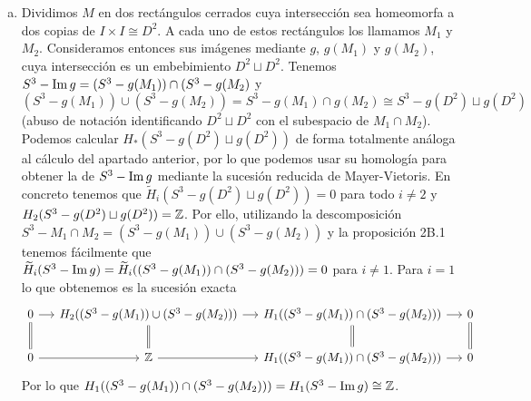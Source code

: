 \documentclass[twoside]{article}
\begin{document}
\begin{solucion}
\begin{enumerate}[(a)]
%



\item Dividimos $M$ en dos rectángulos cerrados cuya intersección sea homeomorfa a dos copias de $I\times I\cong D^2$. A cada uno de estos rectángulos los llamamos $M_1$ y $M_2$. Consideramos entonces sus imágenes mediante $g$, $g(M_1)$ y $g(M_2)$, cuya intersección es un embebimiento $D^2\sqcup D^2$. Tenemos $S^3-\operatorname{Im} g =(S^3-g(M_1))\cap (S^3-g(M_2)$ y $(S^3-g(M_1))\cup (S^3-g(M_2))=S^3-g(M_1)\cap g(M_2)\cong S^3-g(D^2)\sqcup g(D^2)$  (abuso de notación identificando $D^2\sqcup D^2$ con el subespacio de $M_1\cap M_2$). Podemos calcular $H_*(S^3-g(D^2)\sqcup g(D^2))$ de forma totalmente análoga al cálculo del apartado anterior, por lo que podemos usar su homología para obtener la de $S^3-\operatorname{Im} g$ mediante la sucesión reducida de Mayer-Vietoris. En concreto tenemos que $\widetilde{H}_i(S^3-g(D^2)\sqcup g(D^2))=0$ para todo $i\neq 2$ y $H_2(S^3-g(D^2)\sqcup g(D^2))=\mathbb{Z}$. Por ello, utilizando la descomposición $S^3-M_1\cap M_2 =(S^3-g(M_1))\cup (S^3-g(M_2))$ y la proposición 2B.1 tenemos fácilmente que $\widetilde{H}_i(S^3-\operatorname{Im} g)=\widetilde{H}_i((S^3-g(M_1))\cap (S^3-g(M_2)))=0$ para $i\neq 1$. Para $i=1$ lo que obtenemos es la sucesión exacta
\[
\begin{tikzcd}[column sep=13]
0\arrow[r]\arrow[d, equals] & H_2((S^3-g(M_1))\cup (S^3-g(M_2)))\arrow[r]\arrow[d, equals] & H_1((S^3-g(M_1))\cap (S^3-g(M_2)))\arrow[r]\arrow[d,equals] & 0\arrow[d, equals]\\
0 \arrow[r] & \Z\arrow[r] & H_1((S^3-g(M_1))\cap (S^3-g(M_2)))\arrow[r] & 0
\end{tikzcd}
\]
Por lo que $H_1((S^3-g(M_1))\cap (S^3-g(M_2)))=H_1(S^3-\operatorname{Im} g)\cong \mathbb{Z}$. 


\end{enumerate}
\end{solucion}
\end{document}
